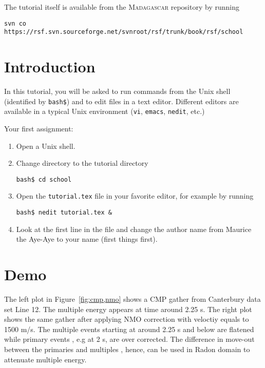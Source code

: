 The tutorial itself is available from the \textsc{Madagascar} repository
by running
\begin{verbatim}
svn co https://rsf.svn.sourceforge.net/svnroot/rsf/trunk/book/rsf/school
\end{verbatim}
\section{Introduction}

In this tutorial, you will be asked to run commands from the Unix
shell (identified by \texttt{bash\$}) and to edit files in a text
editor. Different editors are available in a typical Unix environment
(\texttt{vi}, \texttt{emacs}, \texttt{nedit}, etc.)

Your first assignment:
\begin{enumerate}
\item Open a Unix shell.
\item Change directory to the tutorial directory
\begin{verbatim}
bash$ cd school
\end{verbatim}
\item Open the \texttt{tutorial.tex} file in your favorite editor, for example by
running
\begin{verbatim}
bash$ nedit tutorial.tex & 
\end{verbatim}
\item Look at the first line in the file and change the author name from Maurice the Aye-Aye to your name (first things first). 
\end{enumerate}

\section{Demo}


The left plot in Figure~\ref{fig:cmp,nmo} shows a CMP gather from Canterbury data set Line 12. The multiple energy
appears at time around 2.25 s. The right plot shows the same gather after applying NMO correction with veloctiy equals to 1500 m/s. The multiple events starting at around 2.25 s and below are flatened while primary events , e.g at 2 s,  are over corrected. The difference in move-out between the primaries and multiples , hence, can be used in Radon domain to attenuate multiple energy.

